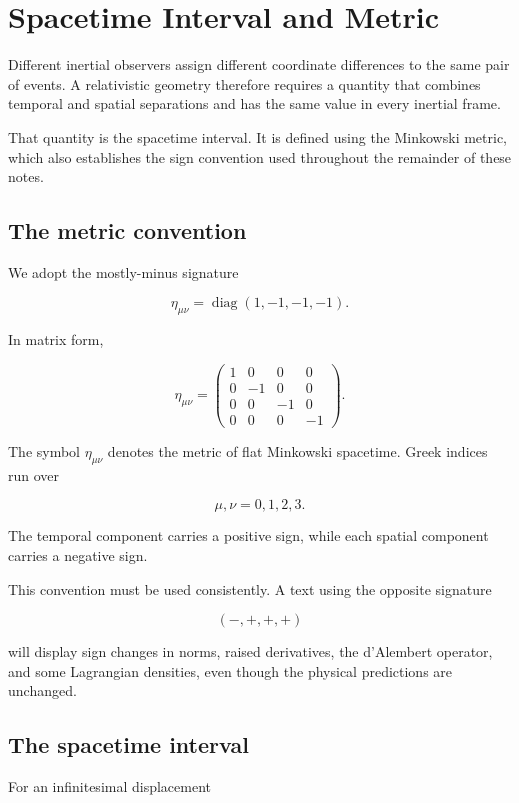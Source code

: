 \section{Spacetime Interval and Metric}
\label{sec:spacetime_interval_and_metric}

Different inertial observers assign different coordinate differences to the same pair of events. A relativistic geometry therefore requires a quantity that combines temporal and spatial separations and has the same value in every inertial frame.

That quantity is the spacetime interval. It is defined using the Minkowski metric, which also establishes the sign convention used throughout the remainder of these notes.

\subsection{The metric convention}

We adopt the mostly-minus signature

\[
\boxed{
\eta_{\mu\nu}
=
\operatorname{diag}(1,-1,-1,-1)
}.
\]

In matrix form,

\[
\eta_{\mu\nu}
=
\begin{pmatrix}
1&0&0&0\\
0&-1&0&0\\
0&0&-1&0\\
0&0&0&-1
\end{pmatrix}.
\]

The symbol \(\eta_{\mu\nu}\) denotes the metric of flat Minkowski spacetime. Greek indices run over

\[
\mu,\nu=0,1,2,3.
\]

The temporal component carries a positive sign, while each spatial component carries a negative sign.

This convention must be used consistently. A text using the opposite signature

\[
(-,+,+,+)
\]

will display sign changes in norms, raised derivatives, the d'Alembert operator, and some Lagrangian densities, even though the physical predictions are unchanged.

\subsection{The spacetime interval}

For an infinitesimal displacement

